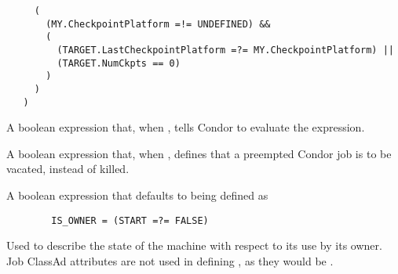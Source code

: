\begin{description}
\begin{verbatim}
     (
       (MY.CheckpointPlatform =!= UNDEFINED) &&
       (
         (TARGET.LastCheckpointPlatform =?= MY.CheckpointPlatform) ||
         (TARGET.NumCkpts == 0)
       )
     )
   )
   \end{verbatim}
   \normalsize

\item[\Macro{WANT\_SUSPEND}] \label{param:WantSuspend}  A boolean expression
   that, when , tells Condor to evaluate the  expression.

\item[\Macro{WANT\_VACATE}] \label{param:WantVacate}  A boolean expression
   that, when , defines that a preempted
   Condor job is to be vacated, instead of killed.

\item[\Macro{IS\_OWNER}] \label{param:IsOwner}  A boolean expression that
   defaults to being defined as
\begin{verbatim}
        IS_OWNER = (START =?= FALSE)
\end{verbatim}
   Used to describe the state of the machine with respect to its use
   by its owner.
   Job ClassAd attributes are not used in defining ,
   as they would be .
\end{description}




